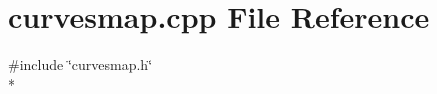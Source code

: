 \section{curvesmap.\+cpp File Reference}
\label{extscaleplotscenewidget_2curvesmap_8cpp}
{\ttfamily \#include \char`\"{}curvesmap.\+h\char`\"{}}\\*
